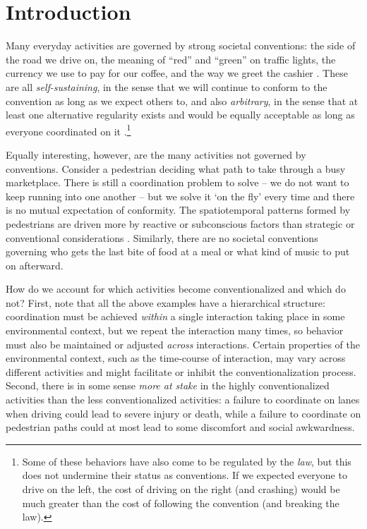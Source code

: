 \documentclass[10pt,letterpaper]{article}
\begin{document}
\linenumbers

\section*{Introduction}
Many everyday activities are governed by strong societal conventions: the side of the road we drive on, the meaning of ``red'' and ``green'' on traffic lights, the currency we use to pay for our coffee, and the way we greet the cashier \cite{GarrodDoherty94_GroupConventionsLinguistics, CaldwellSmith12_Conventions, CentolaBaronchelli15_ConventionEmergence}. These are all \emph{self-sustaining}, in the sense that we will continue to conform to the convention as long as we expect others to, and also \emph{arbitrary}, in the sense that at least one alternative regularity exists and would be equally acceptable as long as everyone coordinated on it \cite{Lewis69_Convention}.\footnote{Some of these behaviors have also come to be regulated by the \emph{law}, but this does not undermine their status as conventions. If we expected everyone to drive on the left, the cost of driving on the right (and crashing) would be much greater than the cost of following the convention (and breaking the law).} 

Equally interesting, however, are the many activities not governed by conventions. Consider a pedestrian deciding what path to take through a busy marketplace. There is still a coordination problem to solve -- we do not want to keep running into one another -- but we solve it `on the fly' every time and there is no mutual expectation of conformity. The spatiotemporal patterns formed by pedestrians are driven more by reactive or subconscious factors than strategic or conventional considerations \cite{HelbingBuznaWerner05_PedestrianCrowdDynamics}. Similarly, there are no societal conventions governing who gets the last bite of food at a meal or what kind of music to put on afterward. 

How do we account for which activities become conventionalized and which do not? First, note that all the above examples have a hierarchical structure: coordination must be achieved \emph{within} a single interaction taking place in some environmental context, but we repeat the interaction many times, so behavior must also be maintained or adjusted \emph{across} interactions. Certain properties of the environmental context, such as the time-course of interaction, may vary across different activities and might facilitate or inhibit the conventionalization process. Second, there is in some sense \emph{more at stake} in the highly conventionalized activities than the less conventionalized activities: a failure to coordinate on lanes when driving could lead to severe injury or death, while a failure to coordinate on pedestrian paths could at most lead to some discomfort and social awkwardness.
\end{document}
